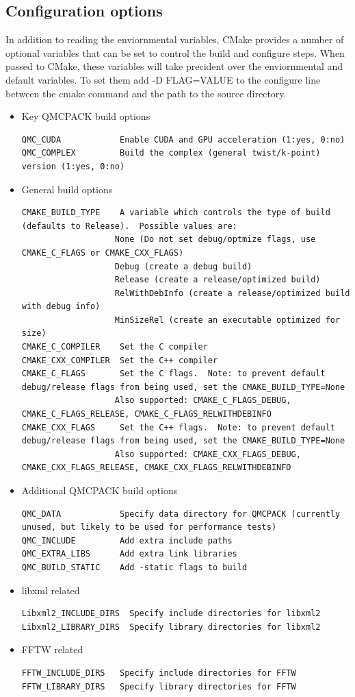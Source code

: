 \subsection{Configuration options}
\label{sec:cmakeoptions}
In addition to reading the enviornmental variables, CMake provides a
number of optional variables that can be set to control the build and
configure steps.  When passed to CMake, these variables will take
precident over the enviornmental and default variables.  To set them
add -D FLAG=VALUE to the configure line between the cmake command and
the path to the source directory.

\begin{itemize}
\item  Key QMCPACK build options
\begin{verbatim}
QMC_CUDA            Enable CUDA and GPU acceleration (1:yes, 0:no)
QMC_COMPLEX         Build the complex (general twist/k-point) version (1:yes, 0:no)
\end{verbatim}
  \item General build options
\begin{verbatim}
CMAKE_BUILD_TYPE    A variable which controls the type of build (defaults to Release).  Possible values are:
                   None (Do not set debug/optmize flags, use CMAKE_C_FLAGS or CMAKE_CXX_FLAGS)
                   Debug (create a debug build)
                   Release (create a release/optimized build)
                   RelWithDebInfo (create a release/optimized build with debug info)
                   MinSizeRel (create an executable optimized for size)
CMAKE_C_COMPILER    Set the C compiler
CMAKE_CXX_COMPILER  Set the C++ compiler
CMAKE_C_FLAGS       Set the C flags.  Note: to prevent default debug/release flags from being used, set the CMAKE_BUILD_TYPE=None
                   Also supported: CMAKE_C_FLAGS_DEBUG, CMAKE_C_FLAGS_RELEASE, CMAKE_C_FLAGS_RELWITHDEBINFO
CMAKE_CXX_FLAGS     Set the C++ flags.  Note: to prevent default debug/release flags from being used, set the CMAKE_BUILD_TYPE=None
                   Also supported: CMAKE_CXX_FLAGS_DEBUG, CMAKE_CXX_FLAGS_RELEASE, CMAKE_CXX_FLAGS_RELWITHDEBINFO
\end{verbatim}
\item Additional QMCPACK build options
\begin{verbatim}
QMC_DATA            Specify data directory for QMCPACK (currently unused, but likely to be used for performance tests)
QMC_INCLUDE         Add extra include paths
QMC_EXTRA_LIBS      Add extra link libraries
QMC_BUILD_STATIC    Add -static flags to build
\end{verbatim}
\item libxml related
\begin{verbatim}
Libxml2_INCLUDE_DIRS  Specify include directories for libxml2
Libxml2_LIBRARY_DIRS  Specify library directories for libxml2
\end{verbatim}
 \item FFTW related
\begin{verbatim}
FFTW_INCLUDE_DIRS   Specify include directories for FFTW
FFTW_LIBRARY_DIRS   Specify library directories for FFTW
\end{verbatim}
\end{itemize}

